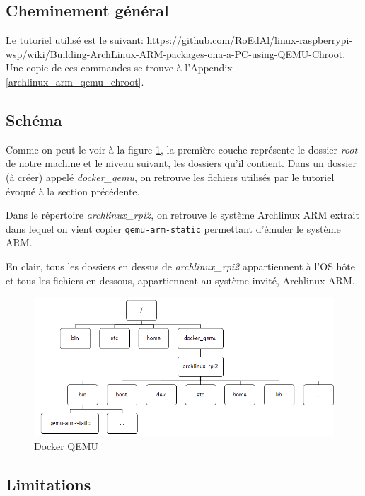 \documentclass[11pt,a4paper,oneside]{report}
\newcommand{\code}[1]{\texttt{#1}} %
\begin{document}
\subsection{Cheminement général}

Le tutoriel utilisé est le suivant: \url{https://github.com/RoEdAl/linux-raspberrypi-wsp/wiki/Building-ArchLinux-ARM-packages-ona-a-PC-using-QEMU-Chroot}. Une copie de ces commandes se trouve à l'Appendix \ref{archlinux_arm_qemu_chroot}.

\subsection{Schéma}

Comme on peut le voir à la figure \ref{fig_chroot_qemu}, la première couche représente le dossier \textit{root} de notre machine et le niveau suivant, les dossiers qu'il contient. Dans un dossier (à créer) appelé \textit{docker\_qemu}, on retrouve les fichiers utilisés par le tutoriel évoqué à la section précédente.

Dans le répertoire \textit{archlinux\_rpi2}, on retrouve le système Archlinux ARM extrait dans lequel on vient copier \code{qemu-arm-static} permettant d'émuler le système ARM.

En clair, tous les dossiers en dessus de \textit{archlinux\_rpi2} appartiennent à l'OS hôte et tous les fichiers en dessous, appartiennent au système invité, Archlinux ARM.

\begin{figure}[H]
\begin{center}
        \includegraphics[scale=0.6]{img/chroot_archlinux_rpi}
        \caption{Docker QEMU}
        \label{fig_chroot_qemu}
    \end{center}
\end{figure}


\subsection{Limitations}
\end{document}
